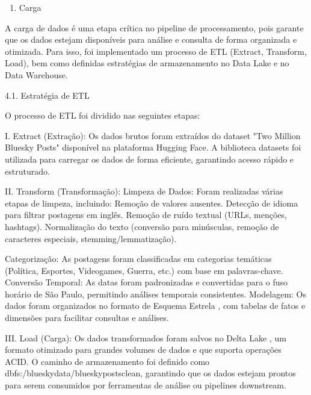 \documentclass[
  letterpaper,
  DIV=11,
  numbers=noendperiod]{scrartcl}
\providecommand{\tightlist}{%
  \setlength{\itemsep}{0pt}\setlength{\parskip}{0pt}}\usepackage{longtable,booktabs,array}
\begin{document}
\begin{enumerate}
\def\labelenumi{\arabic{enumi}.}
\setcounter{enumi}{3}
\tightlist
\item
  Carga 
\end{enumerate}

A carga de dados é uma etapa crítica no pipeline de processamento, pois
garante que os dados estejam disponíveis para análise e consulta de
forma organizada e otimizada. Para isso, foi implementado um processo de
ETL (Extract, Transform, Load), bem como definidas estratégias de
armazenamento no Data Lake e no Data Warehouse.

4.1. Estratégia de ETL

O processo de ETL foi dividido nas seguintes etapas:

\begin{VerbatimWithBreaks}
I. Extract (Extração):  
    Os dados brutos foram extraídos do dataset "Two Million Bluesky Posts" disponível na plataforma Hugging Face.
    A biblioteca datasets foi utilizada para carregar os dados de forma eficiente, garantindo acesso rápido e estruturado.
     

II. Transform (Transformação):  
    Limpeza de Dados:  Foram realizadas várias etapas de limpeza, incluindo:
        Remoção de valores ausentes.
        Detecção de idioma para filtrar postagens em inglês.
        Remoção de ruído textual (URLs, menções, hashtags).
        Normalização do texto (conversão para minúsculas, remoção de caracteres especiais, stemming/lemmatização).
         
    Categorização:  As postagens foram classificadas em categorias temáticas (Política, Esportes, Videogames, Guerra, etc.) com base em palavras-chave.
    Conversão Temporal:  As datas foram padronizadas e convertidas para o fuso horário de São Paulo, permitindo análises temporais consistentes.
    Modelagem:  Os dados foram organizados no formato de Esquema Estrela , com tabelas de fatos e dimensões para facilitar consultas e análises.
     

III. Load (Carga):  
    Os dados transformados foram salvos no Delta Lake , um formato otimizado para grandes volumes de dados e que suporta operações ACID.
    O caminho de armazenamento foi definido como dbfs:/bluesky\textunderscore data/bluesky\textunderscore posts\textunderscore clean, garantindo que os dados estejam prontos para serem consumidos por ferramentas de análise ou pipelines downstream.
     
 
\end{VerbatimWithBreaks}
\end{document}
